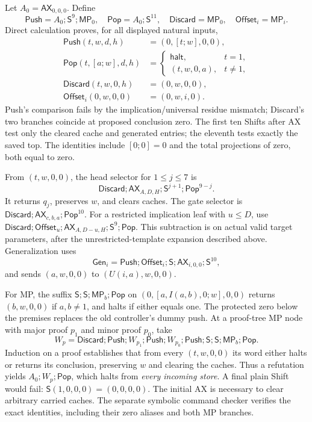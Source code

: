 Let $A_0=\mathsf{AX}_{0,0,0}$. Define
\[
 \mathsf{Push}=A_0;\mathsf S^9;\mathsf{MP}_0,\quad
 \mathsf{Pop}=A_0;\mathsf S^{11},\quad
 \mathsf{Discard}=\mathsf{MP}_0,\quad
 \mathsf{Offset}_i=\mathsf{MP}_i.
\]
Direct calculation proves, for all displayed natural inputs,
\begin{align*}
 \mathsf{Push}(t,w,d,h)&=(0,[t;w],0,0),\\
 \mathsf{Pop}(t,[a;w],d,h)&=
    \begin{cases}\mathsf{halt},&t=1,\\(t,w,0,a),&t\ne1,\end{cases}\\
 \mathsf{Discard}(t,w,0,h)&=(0,w,0,0),\\
 \mathsf{Offset}_i(0,w,0,0)&=(0,w,i,0).
\end{align*}
Push's comparison fails by the implication/universal residue mismatch;
Discard's two branches coincide at proposed conclusion zero. The first
ten Shifts after AX test only the cleared cache and generated entries;
the eleventh tests exactly the saved top. The identities include
$[0;0]=0$ and the total projections of zero, both equal to zero.

From $(t,w,0,0)$, the head selector for $1\leq j\leq7$ is
\[
 \mathsf{Discard};\mathsf{AX}_{A,D,H};\mathsf S^{j+1};
                    \mathsf{Pop}^{9-j}.
\]
It returns $q_j$, preserves $w$, and clears caches. The gate selector is
$\mathsf{Discard};\mathsf{AX}_{c,b,a};\mathsf{Pop}^{10}$.
For a restricted implication leaf with $u\leq D$, use
$\mathsf{Discard};\mathsf{Offset}_u;
\mathsf{AX}_{A,D-u,H};\mathsf S^9;\mathsf{Pop}$.
This subtraction is on actual valid target parameters, after the
unrestricted-template expansion described above. Generalization uses
\[
 \mathsf{Gen}_i=\mathsf{Push};\mathsf{Offset}_i;\mathsf S;
              \mathsf{AX}_{i,0,0};\mathsf S^{10},
\]
and sends $(a,w,0,0)$ to $(U(i,a),w,0,0)$.

For MP, the suffix $\mathsf S;\mathsf S;\mathsf{MP}_b;\mathsf{Pop}$
on $(0,[a,I(a,b),0;w],0,0)$ returns $(b,w,0,0)$ if $a,b\ne1$,
and halts if either equals one. The protected zero below the premises
replaces the old controller's dummy push. At a proof-tree MP node with
major proof $p_1$ and minor proof $p_0$, take
\[
 W_p=\mathsf{Discard};\mathsf{Push};W_{p_1};\mathsf{Push};
 W_{p_0};\mathsf{Push};\mathsf S;\mathsf S;\mathsf{MP}_b;\mathsf{Pop}.
\]
Induction on a proof establishes that from every $(t,w,0,0)$ its word
either halts or returns its conclusion, preserving $w$ and clearing the
caches. Thus a refutation yields $A_0;W_p;\mathsf{Pop}$, which halts
from \emph{every incoming store}. A final plain Shift would fail:
$\mathsf S(1,0,0,0)=(0,0,0,0)$. The initial AX is necessary to clear
arbitrary carried caches. The separate symbolic command checker verifies
the exact identities, including their zero aliases and both MP branches.

